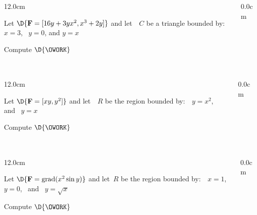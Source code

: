 \begin{frame}
\frametitle{}
\scriptsize
\begin{columns}
\begin{column}{12.0cm}

\EX Let $\D{{\bf F} = [16y + 3yx^2, x^3 + 2y]}$ and let \,\, $C$ be a triangle bounded by: \,\, $x=3$, \, $y=0$, and $y=x$

\vspace{0.2cm}

Compute \quad $\D{\OWORK}$

\vspace{0.2cm}

\SOL

\vspace{7.2cm}

\end{column}
\begin{column}{0.0cm}\end{column}
\end{columns}
\end{frame}

\begin{frame}
\frametitle{}
\scriptsize
\begin{columns}
\begin{column}{12.0cm}

\EX Let $\D{{\bf F} = [xy, y^2]}$ and let \,\, $R$ be the region bounded by: \,\, $y=x^2$, \, and \, $y=x$

\vspace{0.2cm}

Compute \quad $\D{\OWORK}$

\vspace{0.2cm}

\SOL

\vspace{7.2cm}

\end{column}
\begin{column}{0.0cm}\end{column}
\end{columns}
\end{frame}

\begin{frame}
\frametitle{}
\scriptsize
\begin{columns}
\begin{column}{12.0cm}

\EX Let $\D{{\bf F} = \text{grad}(x^2\sin y)}$ and let\, $R$ be the region bounded by: \,\, $x=1$, \, $y=0$, \, and \, $y=\sqrt{x}$

\vspace{0.2cm}

Compute \quad $\D{\OWORK}$

\vspace{0.2cm}

\SOL

\vspace{7.2cm}

\end{column}
\begin{column}{0.0cm}\end{column}
\end{columns}
\end{frame}

